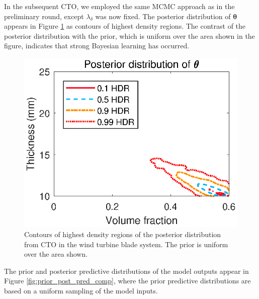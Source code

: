 \documentclass[12pt]{article}
\begin{document}
%
In the subsequent CTO, we employed the same MCMC approach as in the preliminary round, except  $\lambda_\delta$ was now fixed.
%
The posterior distribution of $\boldsymbol\theta$ appears in Figure \ref{fig:wt_marg_post} as contours of highest density regions.
%
The contrast of the posterior distribution with the prior, which is uniform over the area shown in the figure, indicates that strong Bayesian learning has occurred.
%
\begin{figure}[tb]
\centering
\includegraphics[scale=0.8]{FIG_post_dist_contourplot}
\caption{Contours of highest density regions of the posterior distribution from CTO in the wind turbine blade system. The prior is uniform over the area shown.}
\label{fig:wt_marg_post}
\end{figure}
%
The prior and posterior predictive distributions of the model outputs appear in Figure \ref{fig:prior_post_pred_comp}, where the prior predictive distributions are based on a uniform sampling of the model inputs.
%
\end{document}
